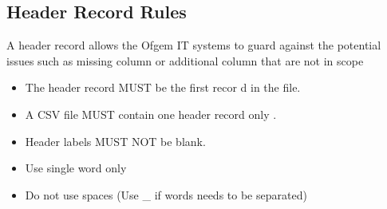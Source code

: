 \subsection{Header Record Rules}
A header record allows the Ofgem IT systems to guard against the potential issues such as missing
column or additional column that are not in scope\begin{itemize}
\item
The header record MUST be the first recor
d in the file.
\item
A CSV file MUST contain one header record
only
.
\item
Header labels MUST NOT be blank.
\item
Use single word only\item
Do not use spaces (Use \_ if words needs to be separated)
\end{itemize}
